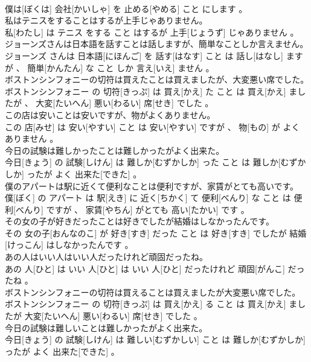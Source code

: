 \documentclass[8pt]{extreport}
\begin{document}
\begin{CJK}{UTF8}{min}
\\	僕は[ぼくは] 会社[かいしゃ] を 止める[やめる] こと にします 。
\\	私はテニスをすることはするが上手じゃありません。	
\\	私[わたし] は テニス をする こと はするが 上手[じょうず] じゃありません 。
\\	ジョーンズさんは日本語を話すことは話しますが、簡単なことしか言えません。	
\\	ジョーンズ さんは 日本語[にほんご] を 話す[はなす] こと は 話し[はなし] ますが 、 簡単[かんたん] な こと しか 言え[いえ] ません 。
\\	ボストンシンフォニーの切符は買えたことは買えましたが、大変悪い席でした。	
\\	ボストンシンフォニー の 切符[きっぷ] は 買え[かえ] た こと は 買え[かえ] ましたが 、 大変[たいへん] 悪い[わるい] 席[せき] でした 。
\\	この店は安いことは安いですが、物がよくありません。	
\\	この 店[みせ] は 安い[やすい] こと は 安い[やすい] ですが 、 物[もの] が よく ありません 。
\\	今日の試験は難しかったことは難しかったがよく出来た。	
\\	今日[きょう] の 試験[しけん] は 難しか[むずかしか] った こと は 難しか[むずかしか] ったが よく 出来た[できた] 。
\\	僕のアパートは駅に近くて便利なことは便利ですが、家賃がとても高いです。	
\\	僕[ぼく] の アパート は 駅[えき] に 近く[ちかく] て 便利[べんり] な こと は 便利[べんり] ですが 、 家賃[やちん] がとても 高い[たかい] です 。
\\	その女の子が好きだったことは好きでしたが結婚はしなかったんです。	
\\	その 女の子[おんなのこ] が 好き[すき] だった こと は 好き[すき] でしたが 結婚[けっこん] はしなかったんです 。
\\	あの人はいい人はいい人だったけれど頑固だったね。	
\\	あの 人[ひと] は いい 人[ひと] は いい 人[ひと] だったけれど 頑固[がんこ] だったね 。
\\	ボストンシンフォニーの切符は買えることは買えましたが大変悪い席でした。	
\\	ボストンシンフォニー の 切符[きっぷ] は 買え[かえ] る こと は 買え[かえ] ましたが 大変[たいへん] 悪い[わるい] 席[せき] でした 。
\\	今日の試験は難しいことは難しかったがよく出来た。	
\\	今日[きょう] の 試験[しけん] は 難しい[むずかしい] こと は 難しか[むずかしか] ったが よく 出来た[できた] 。

\end{CJK}
\end{document}
